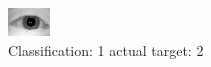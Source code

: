 \begin{figure}[h!]
\begin{center}
\includegraphics[width=0.60\columnwidth]{figures/ID971_class_1_target_2.png}
\end{center}
\caption{ Classification: 1 actual target: 2}
\label{fig:ID971_class_1_target_2}
\end{figure}

